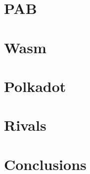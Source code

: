 \thispagestyle{empty} %
\cleardoublepage

\thispagestyle{empty}

\clearpage{\pagestyle{plain}\cleardoublepage}


\clearpage{\pagestyle{plain}\cleardoublepage}
\tableofcontents %

\clearpage{\pagestyle{plain}\cleardoublepage} %

\clearpage{\pagestyle{plain}\cleardoublepage} %
\chapter{PAB} %
\label{chapter:pab} %


\clearpage{\pagestyle{plain}\cleardoublepage}
\chapter{Wasm}
\label{chapter:wasm}


\clearpage{\pagestyle{plain}\cleardoublepage}
\chapter{Polkadot}
\label{chapter:polkadot}


\clearpage{\pagestyle{plain}\cleardoublepage}
\chapter{Rivals}
\label{chapter:rivals}


\clearpage{\pagestyle{plain}\cleardoublepage}
\chapter{Conclusions}
\label{chapter:conclusions}


\clearpage{\pagestyle{plain}\cleardoublepage}




